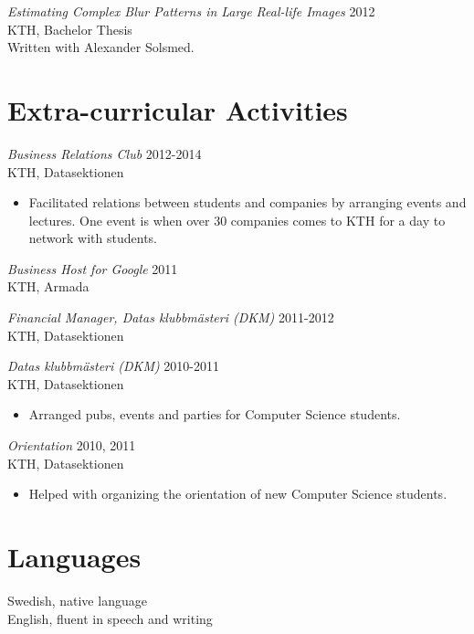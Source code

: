 \documentclass[margin, 10pt]{res} %
\begin{document}
\begin{resume}
{\sl Estimating Complex Blur Patterns in Large Real-life Images} \hfill 2012 \\
KTH, Bachelor Thesis \\
Written with Alexander Solsmed.



\section{Extra-curricular Activities}

{\sl Business Relations Club} \hfill 2012-2014 \\
KTH, Datasektionen
\begin{itemize} 
\item Facilitated relations between students and companies by arranging events and lectures. One event is when over 30 companies comes to KTH for a day to network with students.
\end{itemize}

{\sl Business Host for Google} \hfill 2011 \\
KTH, Armada

{\sl Financial Manager, Datas klubbmästeri (DKM)} \hfill 2011-2012 \\
KTH, Datasektionen

{\sl Datas klubbmästeri (DKM)} \hfill 2010-2011 \\
KTH, Datasektionen
\begin{itemize} 
\item Arranged pubs, events and parties for Computer Science students.
\end{itemize}

{\sl Orientation} \hfill 2010, 2011 \\
KTH, Datasektionen
\begin{itemize} 
\item Helped with organizing the orientation of new Computer Science students.
\end{itemize}


\section{Languages}
Swedish, native language \\
English, fluent in speech and writing


\end{resume}
\end{document}
